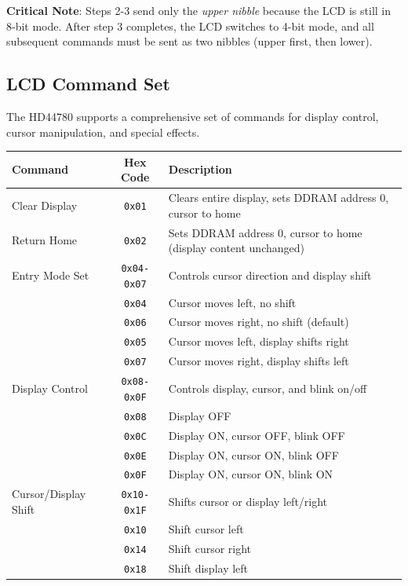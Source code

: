 \noindent
\textbf{Critical Note}: Steps 2-3 send only the \textit{upper nibble} because the LCD is still in 8-bit mode. After step 3 completes, the LCD switches to 4-bit mode, and all subsequent commands must be sent as two nibbles (upper first, then lower).

\subsection{LCD Command Set}

The HD44780 supports a comprehensive set of commands for display control, cursor manipulation, and special effects.

\begin{table}[H]
\centering
\small
\renewcommand{\arraystretch}{1.3}
\begin{tabular}{lcp{7.5cm}}
\toprule
\textbf{Command} & \textbf{Hex Code} & \textbf{Description} \\
\midrule
Clear Display & \texttt{0x01} & Clears entire display, sets DDRAM address 0, cursor to home \\
Return Home & \texttt{0x02} & Sets DDRAM address 0, cursor to home (display content unchanged) \\
\midrule
Entry Mode Set & \texttt{0x04-0x07} & Controls cursor direction and display shift \\
 & \texttt{0x04} & Cursor moves left, no shift \\
 & \texttt{0x06} & Cursor moves right, no shift (default) \\
 & \texttt{0x05} & Cursor moves left, display shifts right \\
 & \texttt{0x07} & Cursor moves right, display shifts left \\
\midrule
Display Control & \texttt{0x08-0x0F} & Controls display, cursor, and blink on/off \\
 & \texttt{0x08} & Display OFF \\
 & \texttt{0x0C} & Display ON, cursor OFF, blink OFF \\
 & \texttt{0x0E} & Display ON, cursor ON, blink OFF \\
 & \texttt{0x0F} & Display ON, cursor ON, blink ON \\
\midrule
Cursor/Display Shift & \texttt{0x10-0x1F} & Shifts cursor or display left/right \\
 & \texttt{0x10} & Shift cursor left \\
 & \texttt{0x14} & Shift cursor right \\
 & \texttt{0x18} & Shift display left \\

\end{tabular}
\end{table}
